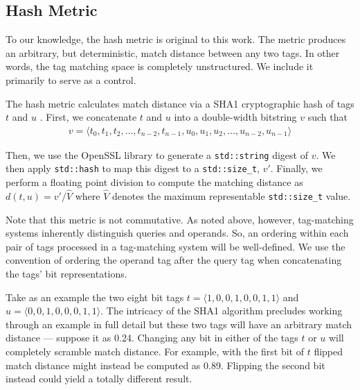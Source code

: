 \subsection{Hash Metric} \label{sec:hash}

To our knowledge, the hash metric is original to this work.
The metric produces an arbitrary, but deterministic, match distance between any two tags.
In other words, the tag matching space is completely unstructured.
We include it primarily to serve as a control.

The hash metric calculates match distance via a SHA1 cryptographic hash of tags $t$ and $u$ \citep{eastlake2001us}.
First, we concatenate $t$ and $u$ into a double-width bitstring $v$ such that
\begin{align*}
v = \langle t_0, t_1, t_2, \dots, t_{n-2}, t_{n-1}, u_0, u_1, u_2, \dots, u_{n-2}, u_{n-1} \rangle
\end{align*}

Then, we use the OpenSSL library to generate a \texttt{std::string} digest of $v$.
We then apply \texttt{std::hash} to map this digest to a \texttt{std::size\_t}, $v'$.
Finally, we perform a floating point division to compute the matching distance as $d(t, u) = v' / \hat{V}$ where $\hat{V}$  denotes the maximum representable \texttt{std::size\_t} value.

Note that this metric is not commutative.
As noted above, however, tag-matching systems inherently distinguish queries and operands.
So, an ordering within each pair of tags processed in a tag-matching system will be well-defined.
We use the convention of ordering the operand tag after the query tag when concatenating the tags' bit representations.

Take as an example the two eight bit tags $t = \langle 1, 0, 0, 1, 0, 0, 1, 1 \rangle$ and $u = \langle 0, 0, 1, 0, 0, 0, 1, 1 \rangle$.
The intricacy of the SHA1 algorithm precludes working through an example in full detail but these two tags will have an arbitrary match distance --- suppose it as 0.24.
Changing any bit in either of the tags $t$ or $u$ will completely scramble match distance.
For example, with the first bit of $t$ flipped match distance might instead be computed as 0.89.
Flipping the second bit instead could yield a totally different result.
